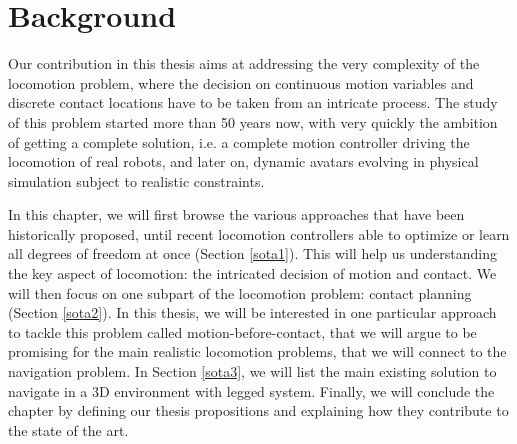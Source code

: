 

\chapter{Background}
\label{sec:sota}
\minitoc
\bigskip



Our contribution in this thesis aims at addressing the very complexity of the locomotion problem, where the decision on continuous motion variables and discrete contact locations have to be taken from an intricate process.
The study of this problem started more than 50 years now, with very quickly the ambition of getting a complete solution, i.e. a complete motion controller driving the locomotion of real robots, and later on, dynamic avatars evolving in physical simulation subject to realistic constraints.

In this chapter, we will first browse the various approaches that have been historically proposed, until recent locomotion controllers able to optimize or learn all degrees of freedom at once (Section \ref{sota1}).
This will help us understanding the key aspect of locomotion: the intricated decision of motion and contact.
We will then focus on one subpart of the locomotion problem: contact planning (Section \ref{sota2}). In this thesis, we will be interested in one particular approach to tackle this problem called motion-before-contact, that we will argue to be promising for the main realistic locomotion problems, that we will connect to the navigation problem.
In Section \ref{sota3}, we will list the main existing solution to navigate in a 3D environment with legged system.
Finally, we will conclude the chapter by defining our thesis propositions and explaining how they contribute to the state of the art.



